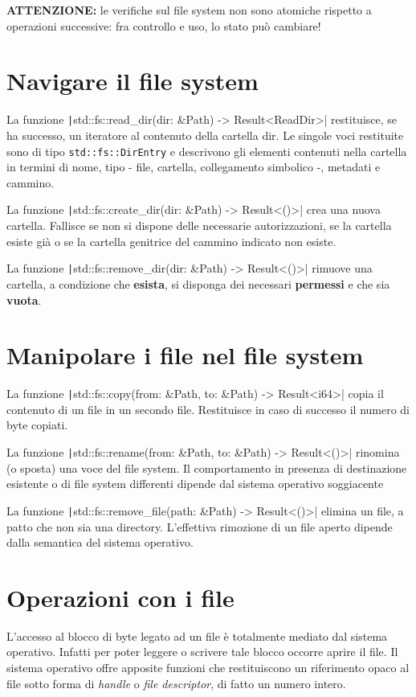 \begin{tcolorbox}
  \textbf{ATTENZIONE:} le verifiche sul file system non sono atomiche rispetto a operazioni successive: fra controllo e
  uso, lo stato può cambiare!
\end{tcolorbox}


\section{Navigare il file system}
La funzione \texttt|std::fs::read_dir(dir: &Path) -> Result<ReadDir>|
restituisce, se ha successo, un iteratore al contenuto della cartella dir.
Le singole voci restituite sono di tipo \texttt{std::fs::DirEntry} e descrivono gli elementi
contenuti nella cartella in termini di nome, tipo - file, cartella, collegamento simbolico -, metadati e cammino.


La funzione \texttt|std::fs::create_dir(dir: &Path) -> Result<()>| crea
una nuova cartella.
Fallisce se non si dispone delle necessarie autorizzazioni, se la cartella
esiste già o se la cartella genitrice del cammino indicato non esiste.


La funzione \texttt|std::fs::remove_dir(dir: &Path) -> Result<()>| rimuove una cartella,
a condizione che \textbf{esista}, si disponga dei necessari \textbf{permessi} e che sia \textbf{vuota}.

\section{Manipolare i file nel file system}
La funzione \texttt|std::fs::copy(from: &Path, to: &Path) -> Result<i64>|
copia il contenuto di un file in un secondo file. Restituisce in caso di
successo il numero di byte copiati.

La funzione \texttt|std::fs::rename(from: &Path, to: &Path) -> Result<()>|
rinomina (o sposta) una voce del file system. Il comportamento in presenza di
destinazione esistente o di file system differenti dipende dal sistema operativo
soggiacente


La funzione \texttt|std::fs::remove_file(path: &Path) -> Result<()>|
elimina un file, a patto che non sia una directory. L'effettiva rimozione di un
file aperto dipende dalla semantica del sistema operativo.


\section{Operazioni con i file}
L'accesso al blocco di byte legato ad un file è totalmente mediato dal sistema
operativo. Infatti per poter leggere o scrivere tale blocco occorre aprire il
file. Il sistema operativo offre apposite funzioni che restituiscono un
riferimento opaco al file sotto forma di \textit{handle} o \textit{file
  descriptor}, di fatto un numero intero.

